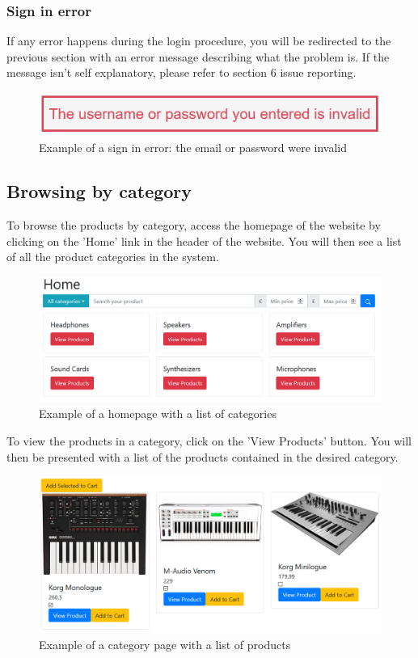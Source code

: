 \subsubsection{Sign in error}
If any error happens during the login procedure, you will be redirected to the previous section with an error message describing what the problem is. If the message isn't self explanatory, please refer to section 6 issue reporting.

\begin{figure}[H]
\centering
\includegraphics[scale=0.6]{res/Immagini/SigninError}
\caption{Example of a sign in error: the email or password were invalid}
\end{figure}

\subsection{Browsing by category}
To browse the products by category, access the homepage of the website by clicking on the 'Home' link in the header of the website. You will then see a list of all the product categories in the system.

\begin{figure}[H]
\centering
\includegraphics[scale=0.6]{res/Immagini/CategoryList}
\caption{Example of a homepage with a list of categories}
\end{figure}

To view the products in a category, click on the 'View Products' button. You will then be presented with a list of the products contained in the desired category.

\begin{figure}[H]
\centering
\includegraphics[scale=0.6]{res/Immagini/CategoryPage}
\caption{Example of a category page with a list of products}
\end{figure}

